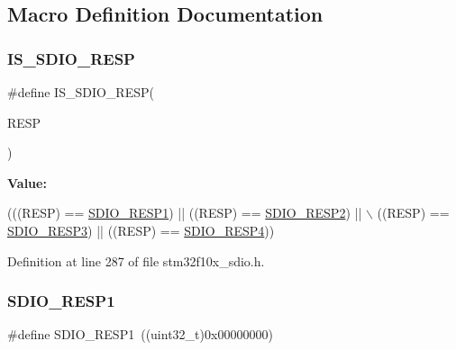 \subsection{Macro Definition Documentation}
\mbox{\label{group___s_d_i_o___response___registers_gaea6a7f75a5e677d50ba5c9ae2d3a7839}} 
\subsubsection{\texorpdfstring{I\+S\+\_\+\+S\+D\+I\+O\+\_\+\+R\+E\+SP}{IS\_SDIO\_RESP}}
{\footnotesize\ttfamily \#define I\+S\+\_\+\+S\+D\+I\+O\+\_\+\+R\+E\+SP(\begin{DoxyParamCaption}\item[{}]{R\+E\+SP }\end{DoxyParamCaption})}

{\bfseries Value\+:}
\begin{DoxyCode}
(((RESP) == \hyperlink{group___s_d_i_o___response___registers_ga9d78943952cf0e36736313d949520a2d}{SDIO\_RESP1}) || ((RESP) == \hyperlink{group___s_d_i_o___response___registers_gabd551272af4161844b5358fd3c3c379c}{SDIO\_RESP2}) || \(\backslash\)
                            ((RESP) == \hyperlink{group___s_d_i_o___response___registers_gae9887669a72395d54d600829a959d2f4}{SDIO\_RESP3}) || ((RESP) == 
      \hyperlink{group___s_d_i_o___response___registers_ga57c3f6414198e5497736e398c02a1d9e}{SDIO\_RESP4}))
\end{DoxyCode}


Definition at line 287 of file stm32f10x\+\_\+sdio.\+h.

\mbox{\label{group___s_d_i_o___response___registers_ga9d78943952cf0e36736313d949520a2d}} 
\subsubsection{\texorpdfstring{S\+D\+I\+O\+\_\+\+R\+E\+S\+P1}{SDIO\_RESP1}}
{\footnotesize\ttfamily \#define S\+D\+I\+O\+\_\+\+R\+E\+S\+P1~((uint32\+\_\+t)0x00000000)}



